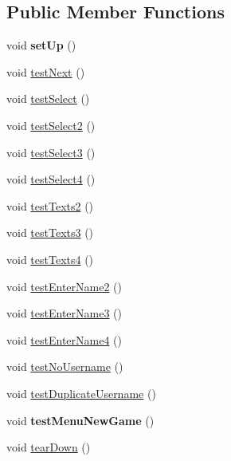 \subsection*{\-Public \-Member \-Functions}
\begin{DoxyCompactItemize}
\item 
\hypertarget{classdominion_1_1view_1_1SelectPlayersTest_a2280efcaa36a8915aa4b82cdcfdaadb9}{void {\bfseries set\-Up} ()}\label{classdominion_1_1view_1_1SelectPlayersTest_a2280efcaa36a8915aa4b82cdcfdaadb9}

\item 
void \hyperlink{classdominion_1_1view_1_1SelectPlayersTest_afafbb68292de2e8ca0429e1dd4aee1fd}{test\-Next} ()
\item 
void \hyperlink{classdominion_1_1view_1_1SelectPlayersTest_adf1d74c8787d9221b3efc72213ce70e9}{test\-Select} ()
\item 
void \hyperlink{classdominion_1_1view_1_1SelectPlayersTest_a73e27499d9bbfc630075481296a6088a}{test\-Select2} ()
\item 
void \hyperlink{classdominion_1_1view_1_1SelectPlayersTest_a8676bebf9b83d1832cb19b7af168bfa3}{test\-Select3} ()
\item 
void \hyperlink{classdominion_1_1view_1_1SelectPlayersTest_a5329d945166eced22678266f60a513df}{test\-Select4} ()
\item 
void \hyperlink{classdominion_1_1view_1_1SelectPlayersTest_aeb4ed825df2ee1d5b35c41d25366903d}{test\-Texts2} ()
\item 
void \hyperlink{classdominion_1_1view_1_1SelectPlayersTest_a6817f6408520eebf21e22d3418e4e8f3}{test\-Texts3} ()
\item 
void \hyperlink{classdominion_1_1view_1_1SelectPlayersTest_ac5cb03c872cfef2038b99026979f8a6e}{test\-Texts4} ()
\item 
void \hyperlink{classdominion_1_1view_1_1SelectPlayersTest_a622fd1d4ab12fa9ca6c3166301e5510f}{test\-Enter\-Name2} ()
\item 
void \hyperlink{classdominion_1_1view_1_1SelectPlayersTest_a2b7ab4e6af0436547328a87cc423c445}{test\-Enter\-Name3} ()
\item 
void \hyperlink{classdominion_1_1view_1_1SelectPlayersTest_a202f9ea7ed204c985f74e07b0e974c2c}{test\-Enter\-Name4} ()
\item 
void \hyperlink{classdominion_1_1view_1_1SelectPlayersTest_aae8bc1ae16932351ca928a63fd4903f4}{test\-No\-Username} ()
\item 
void \hyperlink{classdominion_1_1view_1_1SelectPlayersTest_ae027ae0e11267959d876a2b4757b7818}{test\-Duplicate\-Username} ()
\item 
\hypertarget{classdominion_1_1view_1_1SelectPlayersTest_acd57979fe0618bacaa52ad61b75c555f}{void {\bfseries test\-Menu\-New\-Game} ()}\label{classdominion_1_1view_1_1SelectPlayersTest_acd57979fe0618bacaa52ad61b75c555f}

\item 
void \hyperlink{classdominion_1_1view_1_1SelectPlayersTest_a6cf5f1654ed37fdfca25bd7ebdcffc5f}{tear\-Down} ()
\end{DoxyCompactItemize}


